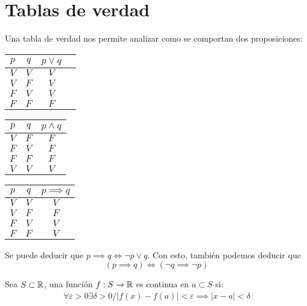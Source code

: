 \documentclass{../Topologia.tex}
\begin{document}
\section{Tablas de verdad}
Una tabla de verdad nos permite analizar como se comportan dos proposiciones:
\begin{table}[h]
	\centering

	\begin{tabular}{c|c|c|c}
		$p$ & $q$ & $p\vee q$\\
		\hline
		$V$ & $V$ & $V$\\
		$V$ & $F$ & $V$\\
		$F$ & $V$ & $V$\\
		$F$ & $F$ & $F$\\  
	\end{tabular}
\end{table}
\begin{table}[h]
	\centering

	\begin{tabular}{c|c|c}
		$p$ & $q$ & $p\wedge q$\\
		\hline
		$V$ & $F$ &$F$\\
		$F$&$V$&$F$\\
		$F$ & $F$ & $F$\\
		$V$ & $V$ & $V$
	\end{tabular}
\end{table}
\begin{table}[h]
	\centering

	\begin{tabular}{c|c|c}
		$p$ & $q$ & $p \implies q$\\
		\hline
		$V$ & $V$ & $V$\\
		$V$&$F$&$F$\\
		$F$&$V$&$V$\\
		$F$&$F$&$V$
		
	\end{tabular}
\end{table}
Se puede deducir que $p \implies q \iff \neg p \vee q$. Con esto, también podemos
deducir que
\[
	(p \implies q) \iff (\neg q \implies \neg p)
\]
\begin{defin}
	Sea $S\subset \mathbb{R}$, una función $f:S\to \mathbb{R}$ es continua en $a\subset S$ si:
	\begin{equation}
		\begin{split}
			\forall \varepsilon > 0 \exists \delta > 0 /
			|f(x)-f(a)|<\varepsilon \implies |x-a| < \delta
		\end{split}
	\end{equation}
\end{defin}
\end{document}
